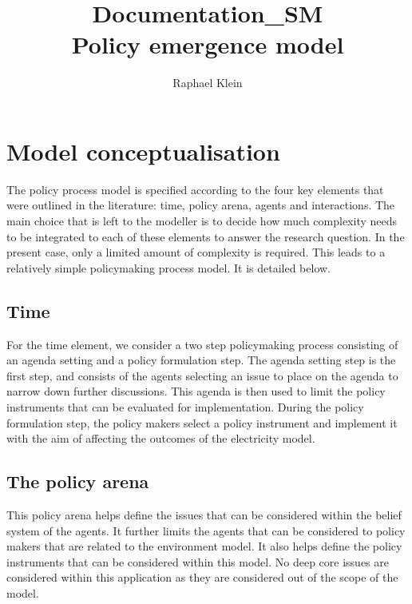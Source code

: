\documentclass[11pt]{article}
\title{Documentation\_SM \\ Policy emergence model}
\author{Raphael Klein}
\begin{document}
\maketitle



\tableofcontents

\section{Model conceptualisation}

The policy process model is specified according to the four key elements that were outlined in the literature: time, policy arena, agents and interactions. The main choice that is left to the modeller is to decide how much complexity needs to be integrated to each of these elements to answer the research question. In the present case, only a limited amount of complexity is required. This leads to a relatively simple policymaking process model. It is detailed below.

\subsection{Time}

For the time element, we consider a two step policymaking process consisting of an agenda setting and a policy formulation step. The agenda setting step is the first step, and consists of the agents selecting an issue to place on the agenda to narrow down further discussions. This agenda is then used to limit the policy instruments that can be evaluated for implementation. During the policy formulation step, the policy makers select a policy instrument and implement it with the aim of affecting the outcomes of the electricity model.


\subsection{The policy arena}

This policy arena helps define the issues that can be considered within the belief system of the agents. It further limits the agents that can be considered to policy makers that are related to the environment model. It also helps define the policy instruments that can be considered within this model. No deep core issues are considered within this application as they are considered out of the scope of the model.
\end{document}
